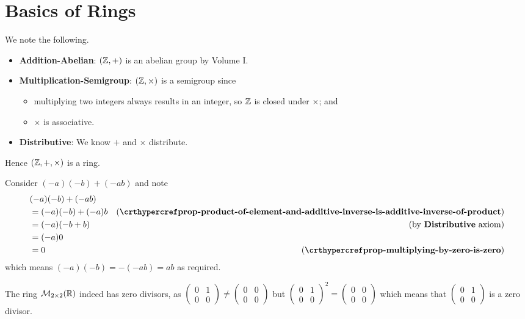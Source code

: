 \section{Basics of Rings}
\begin{questions}
    \item We note the following.
    \begin{itemize}
        \item \textbf{Addition-Abelian}: $(\mathbb{Z}, +)$ is an abelian group by Volume I.
        \item \textbf{Multiplication-Semigroup}: $(\mathbb{Z}, \times)$ is a semigroup since
        \begin{itemize}
            \item multiplying two integers always results in an integer, so $\mathbb{Z}$ is closed under $\times$; and
            \item $\times$ is associative.
        \end{itemize}
        \item \textbf{Distributive}: We know $+$ and $\times$ distribute.
    \end{itemize}
    Hence $(\mathbb{Z}, +, \times)$ is a ring.

    \item Consider $(-a)(-b) + (-ab)$ and note
    \begin{align*}
        &(-a)(-b) + (-ab)\\
        &= (-a)(-b) + (-a)b & (\text{\myref{prop-product-of-element-and-additive-inverse-is-additive-inverse-of-product}})\\
        &= (-a)(-b + b) & (\text{by \textbf{Distributive} axiom})\\
        &= (-a)0\\
        &= 0 & (\myref{prop-multiplying-by-zero-is-zero})
    \end{align*}
    which means $(-a)(-b) = -(-ab) = ab$ as required.

    \item The ring $\mathcal{M}_{2\times2}(\mathbb{R})$ indeed has zero divisors, as $\begin{pmatrix}0&1\\0&0\end{pmatrix} \neq \begin{pmatrix}0&0\\0&0\end{pmatrix}$ but $\begin{pmatrix}0&1\\0&0\end{pmatrix}^2 = \begin{pmatrix}0&0\\0&0\end{pmatrix}$ which means that $\begin{pmatrix}0&1\\0&0\end{pmatrix}$ is a zero divisor.
    

\end{questions}

